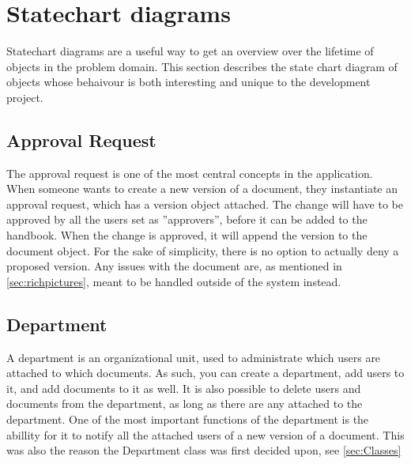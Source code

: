 \section{Statechart diagrams} \label{sec:statechart}
Statechart diagrams are a useful way to get an overview over the lifetime of objects in the problem domain.
This section describes the state chart diagram of objects whose behaivour is both interesting and unique to the development project.

\subsection{Approval Request}
The approval request is one of the most central concepts in the application.
When someone wants to create a new version of a document, they instantiate an approval request, which has a version object attached.
The change will have to be approved by all the users set as ''approvers'', before it can be added to the handbook.
When the change is approved, it will append the version to the document object.
For the sake of simplicity, there is no option to actually deny a proposed version.
Any issues with the document are, as mentioned in \cref{sec:richpictures}, meant to be handled outside of the system instead.

\begin{figure}[H]
	\centering
{}
\end{figure}

\subsection{Department}
A department is an organizational unit, used to administrate which users are attached to which documents.
As such, you can create a department, add users to it, and add documents to it as well.
It is also possible to delete users and documents from the department, as long as there are any attached to the department.
One of the most important functions of the department is the abillity for it to notify all the attached users of a new version of a document.
This was also the reason the Department class was first decided upon, see \cref{sec:Classes}


